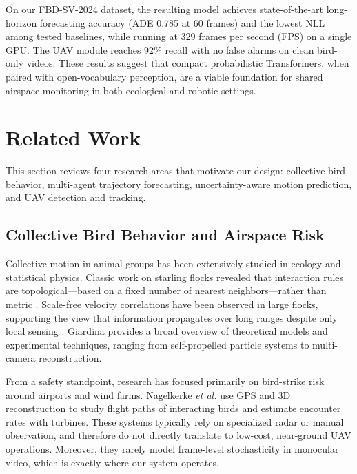 \documentclass[journal]{IEEEtran}
\begin{document}
On our FBD-SV-2024 dataset, the resulting model achieves state-of-the-art long-horizon forecasting accuracy (ADE 0.785 at 60 frames) and the lowest NLL among tested baselines, while running at 329 frames per second (FPS) on a single GPU. The UAV module reaches 92\% recall with no false alarms on clean bird-only videos. These results suggest that compact probabilistic Transformers, when paired with open-vocabulary perception, are a viable foundation for shared airspace monitoring in both ecological and robotic settings.




	
	
	
	
	
\section{Related Work}
\label{sec:related}

This section reviews four research areas that motivate our design: collective bird behavior, multi-agent trajectory forecasting, uncertainty-aware motion prediction, and UAV detection and tracking.

\subsection{Collective Bird Behavior and Airspace Risk}

Collective motion in animal groups has been extensively studied in ecology and statistical physics. Classic work on starling flocks revealed that interaction rules are topological---based on a fixed number of nearest neighbors---rather than metric \cite{Ballerini2008Interaction}. Scale-free velocity correlations have been observed in large flocks, supporting the view that information propagates over long ranges despite only local sensing \cite{Cavagna2010ScaleFree}. Giardina \cite{Giardina2008Collective} provides a broad overview of theoretical models and experimental techniques, ranging from self-propelled particle systems to multi-camera reconstruction.

From a safety standpoint, research has focused primarily on bird-strike risk around airports and wind farms. Nagelkerke \textit{et al.} \cite{Nagelkerke2018Flight} use GPS and 3D reconstruction to study flight paths of interacting birds and estimate encounter rates with turbines. These systems typically rely on specialized radar or manual observation, and therefore do not directly translate to low-cost, near-ground UAV operations. Moreover, they rarely model frame-level stochasticity in monocular video, which is exactly where our system operates.
\end{document}
